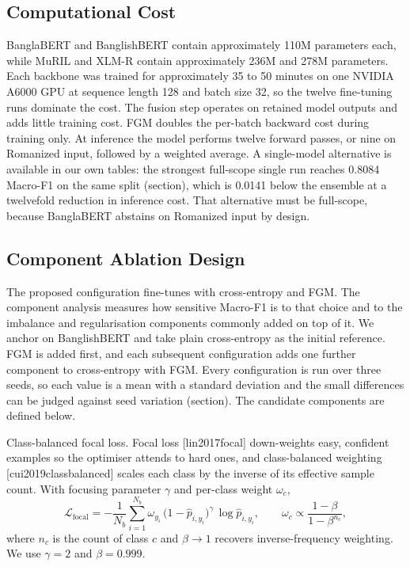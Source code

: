 \documentclass[11pt,a4paper]{article}
\def\citep#1{[#1]}%
\def\cref#1{section}%
\def\emph#1{#1}%
\begin{document}
\subsection{Computational Cost}
\label{sec:cost}

BanglaBERT and BanglishBERT contain approximately 110M parameters each, while MuRIL and XLM-R contain approximately 236M and 278M parameters. Each backbone was trained for approximately 35 to 50 minutes on one NVIDIA A6000 GPU at sequence length 128 and batch size 32, so the twelve fine-tuning runs dominate the cost. The fusion step operates on retained model outputs and adds little training cost. FGM doubles the per-batch backward cost during training only. At inference the model performs twelve forward passes, or nine on Romanized input, followed by a weighted average. A single-model alternative is available in our own tables: the strongest full-scope single run reaches 0.8084 Macro-F1 on the same split (\cref{tab:perrun}), which is 0.0141 below the ensemble at a twelvefold reduction in inference cost. That alternative must be full-scope, because BanglaBERT abstains on Romanized input by design.

\subsection{Component Ablation Design}
\label{sec:ablation-design}

The proposed configuration fine-tunes with cross-entropy and FGM. The component analysis measures how sensitive Macro-F1 is to that choice and to the imbalance and regularisation components commonly added on top of it. We anchor on BanglishBERT and take plain cross-entropy as the initial reference. FGM is added first, and each subsequent configuration adds one further component to cross-entropy with FGM. Every configuration is run over three seeds, so each value is a mean with a standard deviation and the small differences can be judged against seed variation (\cref{sec:ablation-results}). The candidate components are defined below.

\emph{Class-balanced focal loss.} Focal loss \citep{lin2017focal} down-weights easy, confident examples so the optimiser attends to hard ones, and class-balanced weighting \citep{cui2019classbalanced} scales each class by the inverse of its effective sample count. With focusing parameter $\gamma$ and per-class weight $\omega_c$,
\begin{equation}
\mathcal{L}_{\mathrm{focal}} = -\frac{1}{N_b}\sum_{i=1}^{N_b} \omega_{y_i}\,\big(1 - \hat{p}_{i,y_i}\big)^{\gamma}\,\log \hat{p}_{i,y_i},
\qquad
\omega_c \propto \frac{1 - \beta}{1 - \beta^{n_c}},
\label{eq:focal}
\end{equation}
where $n_c$ is the count of class $c$ and $\beta \to 1$ recovers inverse-frequency weighting. We use $\gamma = 2$ and $\beta = 0.999$.
\end{document}
